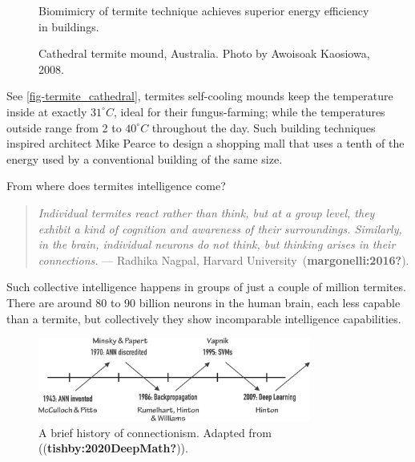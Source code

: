 \documentclass[
  letterpaper,
  DIV=11,
  numbers=noendperiod,
  oneside]{scrreprt}
\begin{document}
\begin{figure}
\begin{minipage}[t]{0.50\linewidth}
{{}

\caption{\label{fig-termite_cathedral}Cathedral termite mound,
Australia. Photo by Awoisoak Kaosiowa, 2008.}

}

\end{minipage}%
\newline
\begin{minipage}[t]{0.50\linewidth}

{\centering 

Biomimicry of termite technique achieves superior energy efficiency in
buildings.

}

\end{minipage}%

\end{figure}

See
\protect\hyperlink{fig-termite_cathedral}{{[}fig-termite\_cathedral{]}},
termites self-cooling mounds keep the temperature inside at exactly
\(31^{\circ} C\), ideal for their fungus-farming; while the temperatures
outside range from 2 to \(40^{\circ} C\) throughout the day. Such
building techniques inspired architect Mike Pearce to design a shopping
mall that uses a tenth of the energy used by a conventional building of
the same size.

From where does termites intelligence come?

\begin{quote}
\emph{Individual termites react rather than think, but at a group level,
they exhibit a kind of cognition and awareness of their surroundings.
Similarly, in the brain, individual neurons do not think, but thinking
arises in their connections.} --- Radhika Nagpal, Harvard
University~(\textbf{margonelli:2016?}).
\end{quote}

Such collective intelligence happens in groups of just a couple of
million termites. There are around 80 to 90 billion neurons in the human
brain, each less capable than a termite, but collectively they show
incomparable intelligence capabilities.

\begin{figure}

{\centering \includegraphics[width=0.8\textwidth,height=\textheight]{imgs/winters.png}

}

\caption{\label{fig-connectionism}A brief history of connectionism.
Adapted from ((\textbf{tishby:2020DeepMath?})).}

\end{figure}
\end{document}
